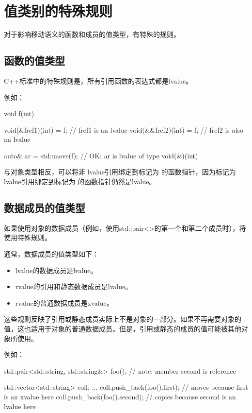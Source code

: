 \section{值类别的特殊规则}
对于影响移动语义的函数和成员的值类型，有特殊的规则。

\subsection{函数的值类型}

C++标准中的特殊规则是，所有引用函数的表达式都是lvalue。

例如：

\begin{cppcode}
void f(int) {
}

void(&fref1)(int) = f; // fref1 is an lvalue
void(&&fref2)(int) = f; // fref2 is also an lvalue

auto& ar = std::move(f); // OK: ar is lvalue of type void(&)(int)
\end{cppcode}

与对象类型相反，可以将非  lvalue引用绑定到标记为  的函数指针，因为标记为  lvalue引用绑定到标记为  的函数指针仍然是lvalue。

\subsection{数据成员的值类型}

如果使用对象的数据成员（例如，使用std::pair<>的第一个和第二个成员时），将使用特殊规则。

通常，数据成员的值类型如下：

\begin{itemize}
	\item lvalue的数据成员是lvalue。
	\item rvalue的引用和静态数据成员是lvalue。
	\item rvalue的普通数据成员是xvalue。
\end{itemize}

这些规则反映了引用或静态成员实际上不是对象的一部分。如果不再需要对象的值，这也适用于对象的普通数据成员。但是，引用或静态的成员的值可能被其他对象所使用。

例如：

\begin{cppcode}
std::pair<std::string, std::string&> foo(); // note: member second is reference

std::vector<std::string> coll;
...
coll.push_back(foo().first); // moves because first is an xvalue here
coll.push_back(foo().second); // copies because second is an lvalue here
\end{cppcode}

